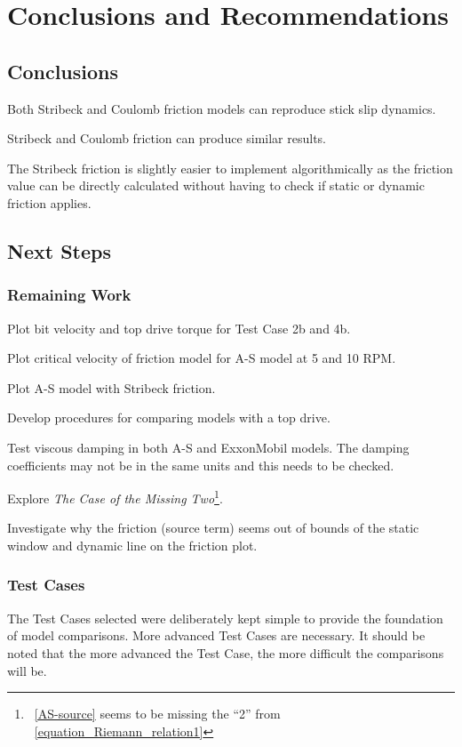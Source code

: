 \chapter{Conclusions and Recommendations}
\section{Conclusions}

\begin{bulletedlist}
	\item Both Stribeck and Coulomb friction models can reproduce stick slip dynamics.
	\item Stribeck and Coulomb friction can produce similar results.
	\item The Stribeck friction is slightly easier to implement algorithmically as the friction value can be directly calculated without having to check if static or dynamic friction applies.
\end{bulletedlist}

\section{Next Steps}
\subsection{Remaining Work}
\begin{bulletedlist}
	\item Plot bit velocity and top drive torque for Test Case 2b and 4b.
	\item Plot critical velocity of friction model for A-S model at 5 and 10 RPM.
	\item Plot A-S model with Stribeck friction.
	\item Develop procedures for comparing models with a top drive.
	\item Test viscous damping in both A-S and ExxonMobil models.  The damping coefficients may not be in the same units and this needs to be checked.
	\item Explore \emph{The Case of the Missing Two}\footnote{\equationname~\ref{AS-source} seems to be missing the ``2'' from \equationname~\ref{equation_Riemann_relation1}}.
	\item Investigate why the friction (source term) seems out of bounds of the static window and dynamic line on the friction plot.
\end{bulletedlist}

\subsection{Test Cases}
The Test Cases selected were deliberately kept simple to provide the foundation of model comparisons.  More advanced Test Cases are necessary.  It should be noted that the more advanced the Test Case, the more difficult the comparisons will be.

